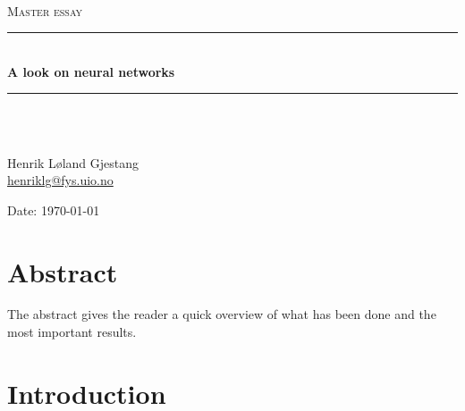 \documentclass[english, a4paper]{report}
\begin{document}
\begin{titlepage}
\begin{center}

\textsc{}\\[1.0cm]
\textsc{\Large Master essay}\\[0.5cm]
\rule{\linewidth}{0.5mm} \\[0.4cm]
{ \huge \bfseries A look on neural networks}\\[0.10cm]
\rule{\linewidth}{0.5mm} \\[1.5cm]
\textsc{}\\[7.0cm]

\begin{minipage}{0.69\textwidth}
    \begin{center} \large
        Henrik Løland Gjestang\\ \url{henriklg@fys.uio.no} \\[0.8cm]
    \end{center}
\end{minipage}
\vfill

\large{Date: \today}
\end{center}
\end{titlepage}

\section*{Abstract}
The abstract gives the reader a quick overview of what has been done and the most important results.


\tableofcontents
\newpage




\section{Introduction}
\end{document}
